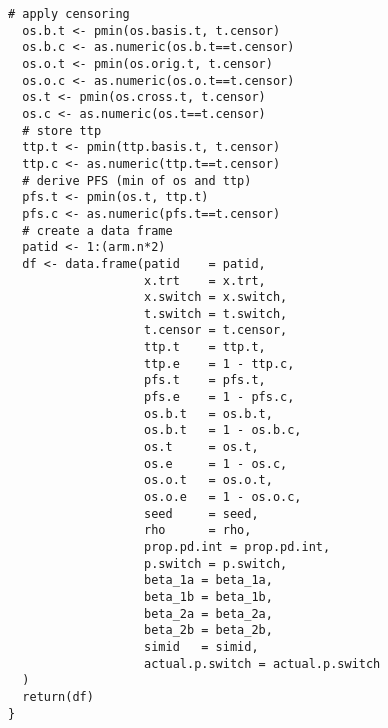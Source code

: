 \begin{Verbatim}[fontsize=\small, baselinestretch=0.75]
  # apply censoring
  os.b.t <- pmin(os.basis.t, t.censor)
  os.b.c <- as.numeric(os.b.t==t.censor)
  os.o.t <- pmin(os.orig.t, t.censor)
  os.o.c <- as.numeric(os.o.t==t.censor)
  os.t <- pmin(os.cross.t, t.censor)
  os.c <- as.numeric(os.t==t.censor)
  # store ttp 
  ttp.t <- pmin(ttp.basis.t, t.censor)
  ttp.c <- as.numeric(ttp.t==t.censor)
  # derive PFS (min of os and ttp) 
  pfs.t <- pmin(os.t, ttp.t)
  pfs.c <- as.numeric(pfs.t==t.censor)
  # create a data frame
  patid <- 1:(arm.n*2)  
  df <- data.frame(patid    = patid,
                   x.trt    = x.trt,
                   x.switch = x.switch,
                   t.switch = t.switch,
                   t.censor = t.censor,
                   ttp.t    = ttp.t,
                   ttp.e    = 1 - ttp.c,
                   pfs.t    = pfs.t,
                   pfs.e    = 1 - pfs.c,
                   os.b.t   = os.b.t,
                   os.b.t   = 1 - os.b.c,
                   os.t     = os.t,
                   os.e     = 1 - os.c,
                   os.o.t   = os.o.t,
                   os.o.e   = 1 - os.o.c,
                   seed     = seed,
                   rho      = rho,
                   prop.pd.int = prop.pd.int,
                   p.switch = p.switch,
                   beta_1a = beta_1a,
                   beta_1b = beta_1b,
                   beta_2a = beta_2a,
                   beta_2b = beta_2b,
                   simid   = simid,
                   actual.p.switch = actual.p.switch
  )
  return(df)
}
\end{Verbatim}